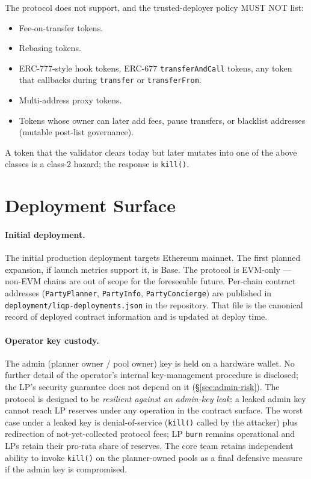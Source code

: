 \documentclass[11pt]{article}
\begin{document}
The protocol does not support, and the trusted-deployer policy MUST NOT
list:

\begin{itemize}
  \item Fee-on-transfer tokens.
  \item Rebasing tokens.
  \item ERC-777-style hook tokens, ERC-677 \texttt{transferAndCall} tokens,
        any token that callbacks during \texttt{transfer} or
        \texttt{transferFrom}.
  \item Multi-address proxy tokens.
  \item Tokens whose owner can later add fees, pause transfers, or
        blacklist addresses (mutable post-list governance).
\end{itemize}

A token that the validator clears today but later mutates into one of the
above classes is a class-2 hazard; the response is \texttt{kill()}.

\section{Deployment Surface}
\label{sec:deployments}

\paragraph{Initial deployment.}
The initial production deployment targets Ethereum mainnet. The first
planned expansion, if launch metrics support it, is Base. The protocol is
EVM-only --- non-EVM chains are out of scope for the foreseeable future.
Per-chain contract addresses (\texttt{PartyPlanner}, \texttt{PartyInfo},
\texttt{PartyConcierge}) are published in
\texttt{deployment/liqp-deployments.json} in the repository. That file
is the canonical record of deployed contract information and is updated
at deploy time.

\paragraph{Operator key custody.}
The admin (planner owner / pool owner) key is held on a hardware wallet.
No further detail of the operator's internal key-management procedure is
disclosed; the LP's security guarantee does not depend on it
(\S\ref{sec:admin-risk}). The protocol is designed to be \emph{resilient
against an admin-key leak}: a leaked admin key cannot reach LP reserves
under any operation in the contract surface. The worst case under a leaked
key is denial-of-service (\texttt{kill()} called by the attacker) plus
redirection of not-yet-collected protocol fees; LP \texttt{burn} remains
operational and LPs retain their pro-rata share of reserves. The core team
retains independent ability to invoke \texttt{kill()} on the planner-owned
pools as a final defensive measure if the admin key is compromised.
\end{document}
